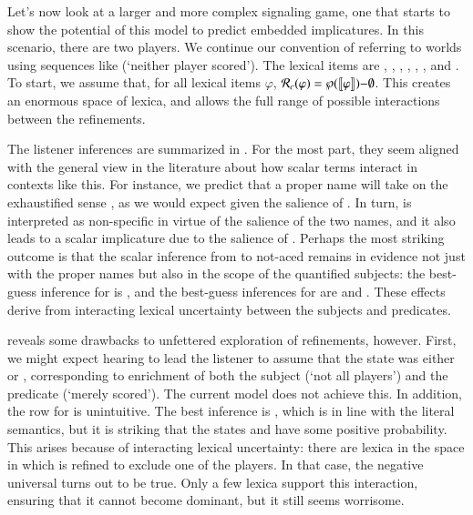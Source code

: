 \documentclass[leqno,12pt]{article}
\begin{document}

Let's now look at a larger and more complex signaling game, one that
starts to show the potential of this model to predict embedded
implicatures. In this scenario, there are two players. We continue our
convention of referring to worlds using sequences like 
(`neither player scored'). The lexical items are ,
, , , , ,
and .  To start, we assume that, for all lexical items
$\varphi$, $\mathcal{R}_{c}(\varphi) = \wp(\llbracket\varphi\rrbracket){-}\emptyset$.  This
creates an enormous space of lexica, and allows the full range of
possible interactions between the refinements. 

The listener inferences are summarized in . For
the most part, they seem aligned with the general view in the
literature about how scalar terms interact in contexts like this. For
instance, we predict that a proper name  will take on the
exhaustified sense , as we would expect given the
salience of . In turn,  is interpreted as
non-specific in virtue of the salience of the two names, and it also
leads to a scalar implicature due to the salience of
. Perhaps the most striking outcome is that the scalar
inference from  to not-aced remains in evidence not just
with the proper names but also in the scope of the quantified
subjects: the best-guess inference for  is
, and the best-guess inferences for 
are  and . These effects derive from interacting
lexical uncertainty between the subjects and predicates.

 reveals some drawbacks to unfettered exploration
of refinements, however. First, we might expect hearing  to lead the listener to assume that the state was
either  or , corresponding to enrichment of both
the subject (`not all players') and the predicate (`merely
scored'). The current model does not achieve this. In addition, the
row for  is unintuitive. The best inference is
, which is in line with the literal semantics, but it is
striking that the states  and  have some positive
probability. This arises because of interacting lexical uncertainty:
there are lexica in the space in which  is refined to
exclude one of the players. In that case, the negative universal turns
out to be true. Only a few lexica support this interaction, ensuring
that it cannot become dominant, but it still seems worrisome.
\end{document}
